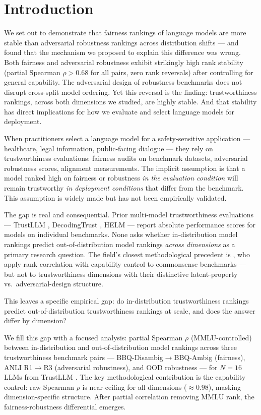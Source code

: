 \section{Introduction}

We set out to demonstrate that fairness rankings of language models are more stable than adversarial robustness rankings across distribution shifts --- and found that the mechanism we proposed to explain this difference was wrong. Both fairness and adversarial robustness exhibit strikingly high rank stability (partial Spearman $\rho > 0.68$ for all pairs, zero rank reversals) after controlling for general capability. The adversarial design of robustness benchmarks does not disrupt cross-split model ordering. Yet this reversal is the finding: trustworthiness rankings, across both dimensions we studied, are highly stable. And that stability has direct implications for how we evaluate and select language models for deployment.

When practitioners select a language model for a safety-sensitive application --- healthcare, legal information, public-facing dialogue --- they rely on trustworthiness evaluations: fairness audits on benchmark datasets, adversarial robustness scores, alignment measurements. The implicit assumption is that a model ranked high on fairness or robustness \emph{in the evaluation condition} will remain trustworthy \emph{in deployment conditions} that differ from the benchmark. This assumption is widely made but has not been empirically validated.

The gap is real and consequential. Prior multi-model trustworthiness evaluations --- TrustLLM \citep{Sun2024TrustLLM}, DecodingTrust \citep{Wang2023DecodingTrust}, HELM \citep{Liang2022Holistic} --- report absolute performance scores for models on individual benchmarks. None asks whether in-distribution model rankings predict out-of-distribution model rankings \emph{across dimensions} as a primary research question. The field's closest methodological precedent is \citet{GeversAndDaelemans2026}, who apply rank correlation with capability control to commonsense benchmarks --- but not to trustworthiness dimensions with their distinctive latent-property vs.\ adversarial-design structure.

This leaves a specific empirical gap: do in-distribution trustworthiness rankings predict out-of-distribution trustworthiness rankings at scale, and does the answer differ by dimension?

We fill this gap with a focused analysis: partial Spearman $\rho$ (MMLU-controlled) between in-distribution and out-of-distribution model rankings across three trustworthiness benchmark pairs --- BBQ-Disambig$\rightarrow$BBQ-Ambig (fairness), ANLI R1$\rightarrow$R3 (adversarial robustness), and OOD robustness --- for $N=16$ LLMs from TrustLLM \citep{Sun2024TrustLLM}. The key methodological contribution is the capability control: raw Spearman $\rho$ is near-ceiling for all dimensions ($\approx 0.98$), masking dimension-specific structure. After partial correlation removing MMLU rank, the fairness-robustness differential emerges.

